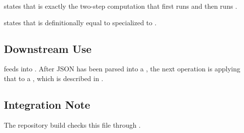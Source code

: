\begin{theorem}
 states that  is exactly
the two-step computation that first runs  and then runs
.
\end{theorem}

\begin{theorem}
 states that  is
definitionally equal to  specialized to
.
\end{theorem}

\subsection{Downstream Use}

 feeds into . After JSON has been parsed
into a , the next operation is applying that  to a
, which is described in .

\subsection{Integration Note}

The repository build checks this file through .
